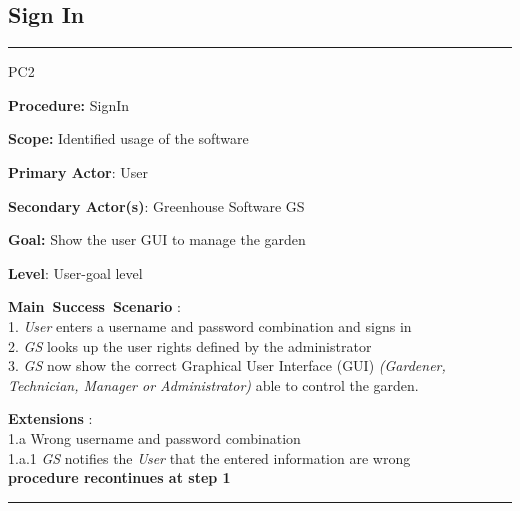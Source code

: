 \subsection{Sign In}
\vspace{0.5cm}
\hrule
\begin{lyxlist}{PC2}
\small{
\item [\textbf{Procedure:}] SignIn
\item [\textbf{Scope:}] Identified usage of the software
\item [\textbf{Primary Actor}:] User
\item [\textbf{Secondary Actor(s)}:] Greenhouse Software GS
\item [\textbf{Goal:}] Show the user GUI to manage the garden
\item [\textbf{Level}:] User-goal level
\item [\textbf{Main~Success~Scenario}]:\\
1. \emph{User} enters a username and password combination and signs in\\
2. \emph{GS} looks up the user rights defined by the administrator\\
3. \emph{GS} now show the correct Graphical User Interface (GUI) \emph{(Gardener, Technician, Manager or Administrator)} able to control the garden.
\item [\textbf{Extensions}]:\\
1.a Wrong username and password combination\\
\hspace*{0.5cm} 1.a.1 \emph{GS} notifies the \emph{User} that the entered information are wrong\\
\hspace*{0.5cm} \textbf{procedure recontinues at step 1}
}
\end{lyxlist}
\hrule
\vspace{0.5cm}



